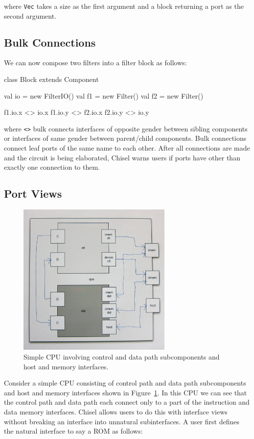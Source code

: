 \documentclass[twocolumn,10pt]{article}
\begin{document}
\noindent
where \verb+Vec+ takes a size as the first argument and a block returning a port as the second argument.

\subsection{Bulk Connections}

We can now compose two filters into a filter block as follows:

\begin{scala}
class Block extends Component { 
  val io = new FilterIO()
  val f1 = new Filter()
  val f2 = new Filter()

  f1.io.x <> io.x
  f1.io.y <> f2.io.x
  f2.io.y <> io.y
}
\end{scala}

\noindent
where \verb+<>+ bulk connects interfaces of opposite gender between
sibling components or interfaces of same gender between parent/child components. 
Bulk connections connect leaf ports of the same name to each other.
After all connections are made and the circuit is being elaborated,
Chisel warns users if ports have other than exactly one connection to them.

\subsection{Port Views}

\begin{figure}
\centerline{\includegraphics[width=3in]{cpu.png}}
\caption{Simple CPU involving control and data path subcomponents and host and memory interfaces.}
\label{fig:cpu}
\end{figure}

Consider a simple CPU consisting of control path and data path subcomponents and host and memory interfaces shown in Figure~\ref{fig:cpu}.
In this CPU we can see that the control path and data path each connect only to a part of the instruction and data memory interfaces. 
Chisel allows users to do this with interface views without breaking an interface into unnatural subinterfaces.
A user first defines the natural interface to say a ROM as follows:
\end{document}
